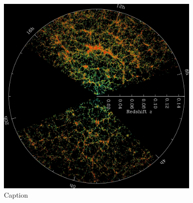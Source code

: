 \begin{figure}
    \centering
    \includegraphics[width=10cm]{Figures/orangepie.jpg}
    \caption{Caption}
    \label{SDSS}
\end{figure}{}




